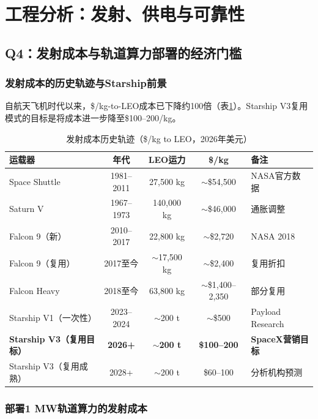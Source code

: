 
\section{工程分析：发射、供电与可靠性}

\subsection{Q4：发射成本与轨道算力部署的经济门槛}

\subsubsection{发射成本的历史轨迹与Starship前景}

自航天飞机时代以来，\$/kg-to-LEO成本已下降约100倍（表\ref{tab:launch_history}）。Starship V3复用模式的目标是将成本进一步降至\$100--200/kg\cite{nasalaunch2018,33fg2026starship,guangfa2026learning}。

\begin{table}[H]
\centering
\small
\caption{发射成本历史轨迹（\$/kg to LEO，2026年美元）}
\label{tab:launch_history}
\begin{tabularx}{\textwidth}{lcccl}
\toprule
\textbf{运载器} & \textbf{年代} & \textbf{LEO运力} & \textbf{\$/kg} & \textbf{备注} \\
\midrule
Space Shuttle & 1981--2011 & 27,500 kg & $\sim$\$54,500 & NASA官方数据 \\
Saturn V & 1967--1973 & 140,000 kg & $\sim$\$46,000 & 通胀调整 \\
Falcon 9（新） & 2010--2017 & 22,800 kg & $\sim$\$2,720 & NASA 2018 \\
Falcon 9（复用） & 2017至今 & $\sim$17,500 kg & $\sim$\$2,400 & 复用折扣 \\
Falcon Heavy & 2018至今 & 63,800 kg & $\sim$\$1,400--2,350 & 部分复用 \\
Starship V1（一次性） & 2023--2024 & $\sim$200 t & $\sim$\$500 & Payload Research \\
\textbf{Starship V3（复用目标）} & \textbf{2026+} & \textbf{$\sim$200 t} & \textbf{\$100--200} & \textbf{SpaceX营销目标} \\
Starship V3（复用成熟） & 2028+ & $\sim$200 t & \$60--100 & 分析机构预测 \\
\bottomrule
\end{tabularx}
\end{table}

\subsubsection{部署1 MW轨道算力的发射成本}

